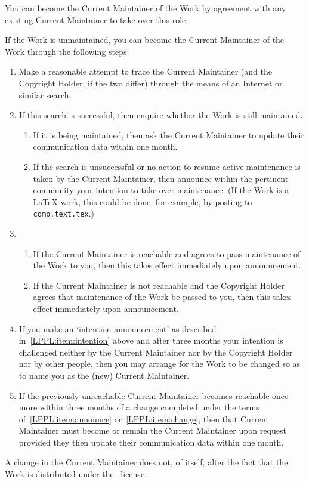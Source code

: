 \begin{LPPLicense}
  You can become the Current Maintainer of the Work by agreement with
  any existing Current Maintainer to take over this role.

  If the Work is unmaintained, you can become the Current Maintainer
  of the Work through the following steps:
  \begin{enumerate}
  \item Make a reasonable attempt to trace the Current Maintainer (and
    the Copyright Holder, if the two differ) through the means of an
    Internet or similar search.
  \item If this search is successful, then enquire whether the Work is
    still maintained.
    \begin{enumerate}
    \item If it is being maintained, then ask the Current Maintainer
      to update their communication data within one month.
     
    \item\label{LPPL:item:intention} If the search is unsuccessful or
      no action to resume active maintenance is taken by the Current
      Maintainer, then announce within the pertinent community your
      intention to take over maintenance.  (If the Work is a \LaTeX{}
      work, this could be done, for example, by posting to
      \texttt{comp.text.tex}.)
    \end{enumerate}
  \item {}
    \begin{enumerate}
    \item If the Current Maintainer is reachable and agrees to pass
      maintenance of the Work to you, then this takes effect
      immediately upon announcement.
     
    \item\label{LPPL:item:announce} If the Current Maintainer is not
      reachable and the Copyright Holder agrees that maintenance of
      the Work be passed to you, then this takes effect immediately
      upon announcement.
    \end{enumerate}
  \item\label{LPPL:item:change} If you make an `intention
    announcement' as described in~\ref{LPPL:item:intention} above and
    after three months your intention is challenged neither by the
    Current Maintainer nor by the Copyright Holder nor by other
    people, then you may arrange for the Work to be changed so as to
    name you as the (new) Current Maintainer.
     
  \item If the previously unreachable Current Maintainer becomes
    reachable once more within three months of a change completed
    under the terms of~\ref{LPPL:item:announce}
    or~\ref{LPPL:item:change}, then that Current Maintainer must
    become or remain the Current Maintainer upon request provided they
    then update their communication data within one month.
  \end{enumerate}
  A change in the Current Maintainer does not, of itself, alter the
  fact that the Work is distributed under the \LPPL\ license.


\end{LPPLicense}
